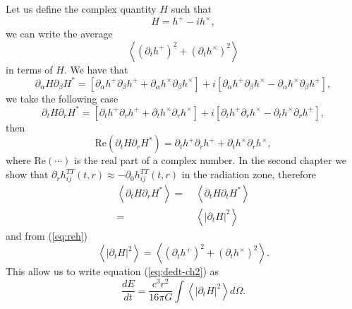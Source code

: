 Let us define the complex quantity $H$ such that
\[
H=h^{+}-ih^{\times},
\]
we can write the average
\[
\left\langle \left(\partial_{t}h^{+}\right)^{2}+\left(\partial_{t}h^{\times}\right)^{2}\right\rangle 
\]
in terms of $H$. We have that
\[
\partial_{\alpha}H\partial_{\beta}H^{*}=\left[\partial_{\alpha}h^{+}\partial_{\beta}h^{+}+\partial_{\alpha}h^{\times}\partial_{\beta}h^{\times}\right]+i\left[\partial_{\alpha}h^{+}\partial_{\beta}h^{\times}-\partial_{\alpha}h^{\times}\partial_{\beta}h^{+}\right],
\]
we take the following case
\[
\partial_{t}H\partial_{r}H^{*}=\left[\partial_{t}h^{+}\partial_{r}h^{+}+\partial_{t}h^{\times}\partial_{r}h^{\times}\right]+i\left[\partial_{t}h^{+}\partial_{r}h^{\times}-\partial_{t}h^{\times}\partial_{r}h^{+}\right],
\]
then
\begin{equation}
\text{Re}\left(\partial_{t}H\partial_{r}H^{*}\right)=\partial_{t}h^{+}\partial_{r}h^{+}+\partial_{t}h^{\times}\partial_{r}h^{\times},\label{eq:reh}
\end{equation}
where $\text{Re}\left(\cdots\right)$ is the real part of a complex
number. In the second chapter we show that $\partial_{r}h_{ij}^{TT}\left(t,r\right)\approx-\partial_{0}h_{ij}^{TT}\left(t,r\right)$
in the radiation zone, therefore
\begin{align*}
\left\langle \partial_{t}H\partial_{r}H^{*}\right\rangle = & \ \left\langle \partial_{t}H\partial_{t}H^{*}\right\rangle \\
= & \ \left\langle \left|\partial_{t}H\right|^{2}\right\rangle 
\end{align*}
and from (\ref{eq:reh})
\[
\left\langle \left|\partial_{t}H\right|^{2}\right\rangle =\left\langle \left(\partial_{t}h^{+}\right)^{2}+\left(\partial_{t}h^{\times}\right)^{2}\right\rangle .
\]
This allow us to write equation (\ref{eq:dedt-ch2}) as
\[
\frac{dE}{dt}=\frac{c^{3}r^{2}}{16\pi G}\int\left\langle \left|\partial_{t}H\right|^{2}\right\rangle d\Omega.
\]

